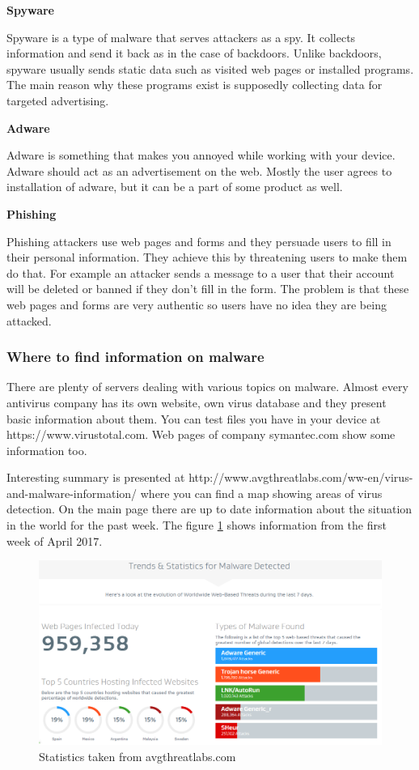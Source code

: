 \documentclass[review]{elsarticle}
\begin{document}
\textbf{Spyware}

Spyware is a type of malware that serves attackers as a spy. It collects information and send it back as in the case of backdoors. Unlike backdoors, spyware usually sends static data such as visited web pages or installed programs. The main reason why these programs exist is supposedly collecting data for targeted advertising.

\textbf{Adware}

Adware is something that makes you annoyed while working with your device. Adware should act as an advertisement on the web. Mostly the user agrees to installation of adware, but it can be a part of some product as well.

\textbf{Phishing}

Phishing attackers use web pages and forms and they persuade users to fill in their personal information. They achieve this by threatening users to make them do that. For example an attacker sends a message to a user that their account will be deleted or banned if they don't fill in the form. The problem is that these web pages and forms are very authentic so users have no idea they are being attacked.

\subsubsection{Where to find information on malware}
There are plenty of servers dealing with various topics on malware. Almost every antivirus company has its own website, own virus database and they present basic information about them. You can test files you have in your device at https://www.virustotal.com. Web pages of company symantec.com show some information too. 

Interesting summary is presented at http://www.avgthreatlabs.com/ww-en/virus-and-malware-information/ where you can find a map showing areas of virus detection. On the main page there are up to date information about the situation in the world for the past week. The figure \ref{pict:avg} shows information from the first week of April 2017.

\begin{figure}[!h]
\caption{Statistics taken from avgthreatlabs.com}
\label{pict:avg}
\includegraphics[scale=0.5]{pict/avgthreatlab.png}
\end{figure}
\end{document}
